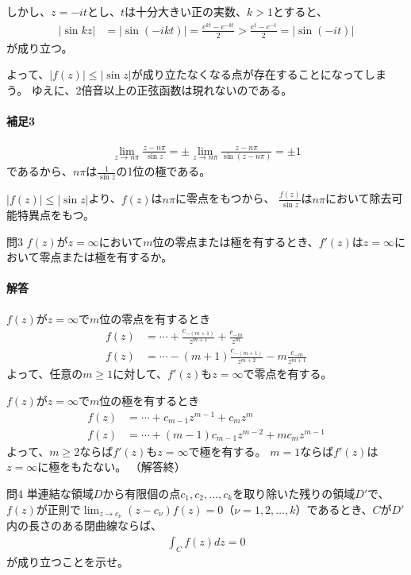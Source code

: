 しかし、$z=-it$とし、$t$は十分大きい正の実数、$k>1$とすると、
\begin{align*}
    \left|\sin kz\right|
    &=\left|\sin(-ikt)\right|
    =\frac{e^{kt}-e^{-kt}}{2}
    >\frac{e^{t}-e^{-t}}{2}
    =|\sin(-it)|
\end{align*}
が成り立つ。

よって、$|f(z)|\le|\sin z|$が成り立たなくなる点が存在することになってしまう。
ゆえに、2倍音以上の正弦函数は現れないのである。

\paragraph{補足3}
\begin{align*}
    \lim_{z\longrightarrow n\pi}\frac{z-n\pi}{\sin z}
    =\pm\lim_{z\longrightarrow n\pi}\frac{z-n\pi}{\sin(z-n\pi)}
    =\pm1
\end{align*}
であるから、$n\pi$は$\frac{1}{\sin z}$の1位の極である。

$|f(z)|\le|\sin z|$より、$f(z)$は$n\pi$に零点をもつから、
$\frac{f(z)}{\sin z}$は$n\pi$において除去可能特異点をもつ。


\begin{mysimplebox}{問3}
    $f(z)$が$z=\infty$において$m$位の零点または極を有するとき、$f'(z)$は$z=\infty$において零点または極を有するか。
\end{mysimplebox}
\paragraph{解答}
$f(z)$が$z=\infty$で$m$位の零点を有するとき
\begin{align*}
    f(z)&=\cdots+\frac{c_{-(m+1)}}{z^{m+1}}+\frac{c_{-m}}{z^{m}}\\
    f(z)&=\cdots-(m+1)\frac{c_{-(m+1)}}{z^{m+2}}-m\frac{c_{-m}}{z^{m+1}}
\end{align*}
よって、任意の$m\ge1$に対して、$f'(z)$も$z=\infty$で零点を有する。

$f(z)$が$z=\infty$で$m$位の極を有するとき
\begin{align*}
    f(z)&=\cdots+c_{m-1}z^{m-1}+c_mz^m\\
    f(z)&=\cdots+(m-1)c_{m-1}z^{m-2}+mc_mz^{m-1}
\end{align*}
よって、$m\ge2$ならば$f'(z)$も$z=\infty$で極を有する。
$m=1$ならば$f'(z)$は$z=\infty$に極をもたない。
（解答終）

\begin{mysimplebox}{問4}
    単連結な領域$D$から有限個の点$c_1,c_2,\dots,c_k$を取り除いた残りの領域$D'$で、$f(z)$が正則で$\lim_{z\longrightarrow c_\nu}(z-c_\nu)f(z)=0$（$\nu=1,2,\dots,k$）であるとき、$C$が$D'$内の長さのある閉曲線ならば、
    \begin{align*}
        \int_Cf(z)dz=0
    \end{align*}
    が成り立つことを示せ。
\end{mysimplebox}
